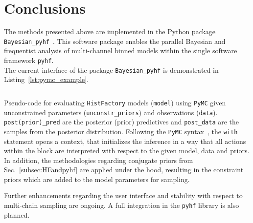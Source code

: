 \section{Conclusions}\label{sec:conclusions}

The methods presented above are implemented in the Python package \texttt{Bayesian\_pyhf}~\cite{BayesianPyhf}. This software package enables the parallel Bayesian and frequentist analysis of multi-channel binned models within the single software framework \texttt{pyhf}.\\
The current interface of the package \texttt{Bayesian\_pyhf} is demonstrated in Listing~\ref{lst:pymc_example}.

\begin{listing}
 \inputminted{python}{src/code/pymc_example.py}
 \caption{Pseudo-code for evaluating \texttt{HistFactory} models (\texttt{model}) using \texttt{PyMC} given unconstrained parameters (\texttt{unconstr\_priors}) and observations (\texttt{data}). \texttt{post(prior)\_pred} are the posterior (prior) predictives and \texttt{post\_data} are the samples from the posterior distribution. Following the \texttt{PyMC} syntax~\cite{PyMC}, the \texttt{with} statement opens a context, that initializes the inference in a way that all actions within the block are interpreted with respect to the given model, data and priors. In addition, the methodologies regarding conjugate priors from Sec.~\ref{subsec:HFandpyhf} are applied under the hood, resulting in the constraint priors which are added to the model parameters for sampling.}
 \label{lst:pymc_example}
\end{listing}

\noindent Further enhancements regarding the user interface and stability with respect to multi-chain sampling are ongoing. A full integration in the \texttt{pyhf} library is also planned.
